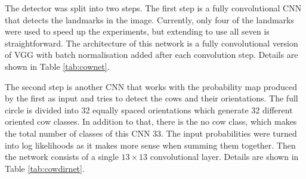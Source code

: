 \documentclass[10pt,a4paper,twocolumn]{article}
\begin{document}
The detector was split into two steps. The first step is a fully convolutional CNN that detects the landmarks in the image. Currently, only four of the landmarks were used to speed up the experiments, but extending to use all seven is straightforward. The architecture of this network is a fully convolutional version of VGG \cite{Simonyan14c} with batch normalisation \cite{DBLP:journals/corr/IoffeS15} added after each convolution step. Details are shown in Table \ref{tab:cownet}.

The second step is another CNN that works with the probability map produced by the first as input and tries to detect the cows and their orientations. The full circle is divided into 32 equally spaced orientations which generate 32 different oriented cow classes. In addition to that, there is the no cow class, which makes the total number of classes of this CNN 33. The input probabilities were turned into log likelihoods as it makes more sense when summing them together. Then the network consists of a single $ 13 \times 13 $ convolutional layer. Details are shown in Table \ref{tab:cowdirnet}.
\end{document}
